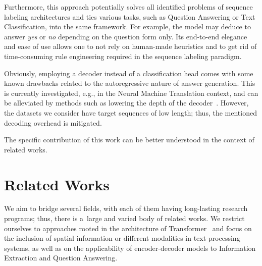 \documentclass[runningheads]{llncs}
\begin{document}
Furthermore, this approach potentially solves all identified problems of sequence labeling architectures and ties various tasks, such as Question Answering or Text Classification, into the same framework. For example, the model may deduce to answer \textit{yes} or \textit{no} depending on the question form only. Its end-to-end elegance and ease of use allows one to not rely on human-made heuristics and to get rid of time-consuming rule engineering required in the sequence labeling paradigm. 

Obviously, employing a decoder instead of a classification head comes with some known drawbacks related to the autoregressive nature of answer generation. This is currently investigated, e.g., in the Neural Machine Translation context, and can be alleviated by methods such as lowering the depth of the decoder~\cite{ren-etal-2020-study,kasai2020deep}. However, the datasets we consider have target sequences of low length; thus, the mentioned decoding overhead is mitigated.































\bigskip\noindent The specific contribution of this work can be better understood in the context of related works.

\section{Related Works}\label{sec:related_works}

We aim to bridge several fields, with each of them having long-lasting research programs; thus, there is a~large and varied body of related works. We restrict ourselves to approaches rooted in the architecture of Transformer~\cite{transformer} and focus on the inclusion of spatial information or different modalities in text-processing systems, as well as on the applicability of encoder-decoder models to Information Extraction and Question Answering.
\end{document}
